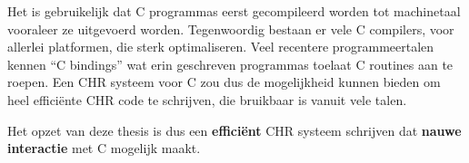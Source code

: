 Het is gebruikelijk dat C programmas eerst gecompileerd worden tot machinetaal vooraleer ze uitgevoerd worden. Tegenwoordig bestaan er vele C compilers, voor allerlei platformen, die sterk optimaliseren. Veel recentere programmeertalen kennen ``C bindings'' wat erin geschreven programmas toelaat C routines aan te roepen. Een CHR systeem voor C zou dus de mogelijkheid kunnen bieden om heel effici\"ente CHR code te schrijven, die bruikbaar is vanuit vele talen.

Het opzet van deze thesis is dus een {\bf effici\"ent} CHR systeem schrijven dat {\bf nauwe interactie} met C mogelijk maakt.



